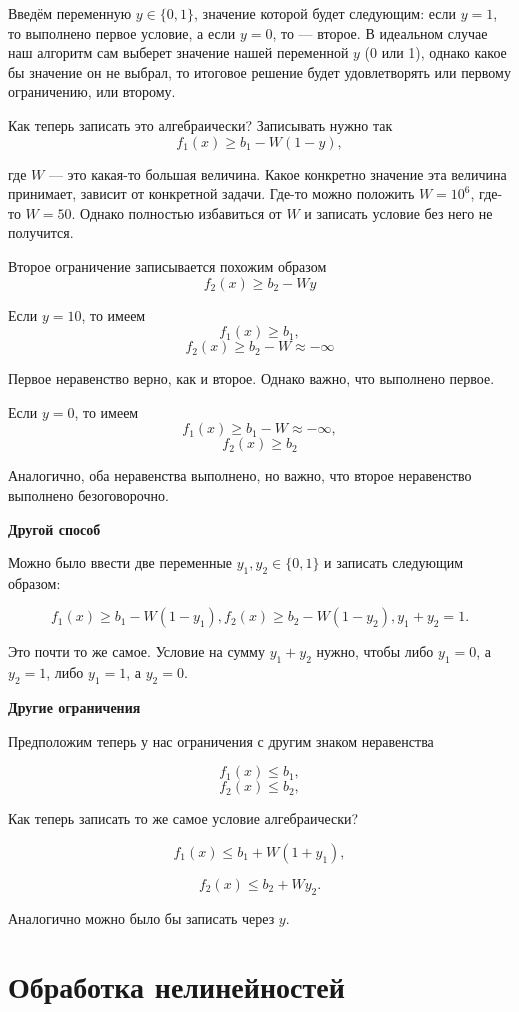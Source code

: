 Введём переменную $y \in \{0, 1\}$, значение которой будет следующим: если $y = 1$, то выполнено первое условие, а если $y = 0$, то --- второе. В идеальном случае наш алгоритм сам выберет значение нашей переменной $y$ (0 или 1), однако какое бы значение он не выбрал, то итоговое решение будет удовлетворять или первому ограничению, или второму.

Как теперь записать это алгебраически? Записывать нужно так
\[
	f_1(x) \ge b_1 - W(1-y),
\]

где $W$ --- это какая-то большая величина. Какое конкретно значение эта величина принимает, зависит от конкретной задачи. Где-то можно положить $W = 10^6$, где-то $W = 50$. Однако полностью избавиться от $W$ и записать условие без него не получится.

Второе ограничение записывается похожим образом
\[
	f_2(x) \ge b_2 - Wy
\]

Если $y =10$, то имеем
\[f_1(x) \ge b_1,\]
\[f_2(x) \ge b_2 - W \approx -\infty\]

Первое неравенство верно, как и второе. Однако важно, что выполнено первое.

Если $y = 0$, то имеем 
\[f_1(x) \ge b_1 - W \approx -\infty,\]
\[f_2(x) \ge b_2\]

Аналогично, оба неравенства выполнено, но важно, что второе неравенство выполнено безоговорочно.

\textbf{Другой способ}

Можно было ввести две переменные $y_1, y_2 \in \{0, 1\}$ и записать следующим образом:

\[
	f_1(x) \ge b_1 - W(1-y_1),
	f_2(x) \ge b_2 - W(1-y_2),
	y_1+y_2 = 1.
\]

Это почти то же самое. Условие на сумму $y_1 + y_2$ нужно, чтобы либо $y_1 = 0$, а $y_2 = 1$, либо $y_1 = 1$, а $y_2 = 0$.

\textbf{Другие ограничения}

Предположим теперь у нас ограничения с другим знаком неравенства

\[f_1(x) \le b_1,\]
\[f_2(x) \le b_2,\]

Как теперь записать то же самое условие алгебраически?

\[
	f_1(x) \le b_1 + W(1+y_1),
\]

\[
	f_2(x) \le b_2 + Wy_2.
\]

Аналогично можно было бы записать через $y$.


\section{Обработка нелинейностей}

